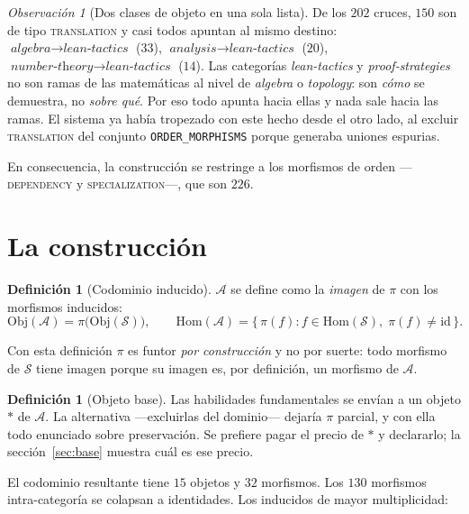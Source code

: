 \documentclass[11pt,a4paper]{article}
\theoremstyle{plain}
\theoremstyle{definition}
\newtheorem{definicion}[teorema]{Definición}
\theoremstyle{remark}
\newtheorem{observacion}[teorema]{Observación}
\newcommand{\Skills}{\mathcal{S}}
\newcommand{\Agentes}{\mathcal{A}}
\newcommand{\base}{\ast}
\begin{document}
\begin{observacion}[Dos clases de objeto en una sola lista]
De los $202$ cruces, $150$ son de tipo \textsc{translation} y casi todos apuntan
al mismo destino: $\textit{algebra}\to\textit{lean-tactics}$ ($33$),
$\textit{analysis}\to\textit{lean-tactics}$ ($20$),
$\textit{number-theory}\to\textit{lean-tactics}$ ($14$). Las categorías
\textit{lean-tactics} y \textit{proof-strategies} no son ramas de las
matemáticas al nivel de \textit{algebra} o \textit{topology}: son \emph{cómo} se
demuestra, no \emph{sobre qué}. Por eso todo apunta hacia ellas y nada sale
hacia las ramas. El sistema ya había tropezado con este hecho desde el otro
lado, al excluir \textsc{translation} del conjunto \texttt{ORDER\_MORPHISMS}
porque generaba uniones espurias.
\end{observacion}

En consecuencia, la construcción se restringe a los morfismos de orden
—\textsc{dependency} y \textsc{specialization}—, que son $226$.

\section{La construcción}

\begin{definicion}[Codominio inducido]
$\Agentes$ se define como la \emph{imagen} de $\pi$ con los morfismos
inducidos:
\[
  \mathrm{Obj}(\Agentes) = \pi\bigl(\mathrm{Obj}(\Skills)\bigr),
  \qquad
  \mathrm{Hom}(\Agentes) = \bigl\{\, \pi(f) : f\in\mathrm{Hom}(\Skills),\;
  \pi(f)\neq\mathrm{id} \,\bigr\}.
\]
\end{definicion}

Con esta definición $\pi$ es funtor \emph{por construcción} y no por suerte:
todo morfismo de $\Skills$ tiene imagen porque su imagen es, por definición, un
morfismo de $\Agentes$.

\begin{definicion}[Objeto base]
Las habilidades fundamentales se envían a un objeto $\base$ de $\Agentes$. La
alternativa —excluirlas del dominio— dejaría $\pi$ parcial, y con ella todo
enunciado sobre preservación. Se prefiere pagar el precio de $\base$ y
declararlo; la sección~\ref{sec:base} muestra cuál es ese precio.
\end{definicion}

El codominio resultante tiene $15$ objetos y $32$ morfismos. Los $130$ morfismos
intra-categoría se colapsan a identidades. Los inducidos de mayor multiplicidad:
\end{document}
